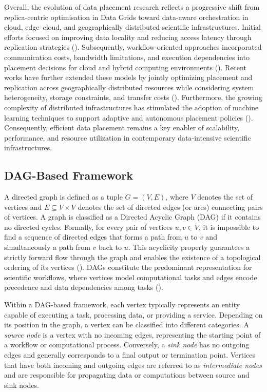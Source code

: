 \documentclass[a4paper,fleqn]{cas-dc}
\begin{document}
Overall, the evolution of data placement research reflects a progressive shift from replica-centric optimisation in Data Grids toward data-aware orchestration in cloud, edge--cloud, and geographically distributed scientific infrastructures. Initial efforts focused on improving data locality and reducing access latency through replication strategies (\citealp{rasool2007comparative}). Subsequently, workflow-oriented approaches incorporated communication costs, bandwidth limitations, and execution dependencies into placement decisions for cloud and hybrid computing environments (\citealp{lin2019time}). Recent works have further extended these models by jointly optimizing placement and replication across geographically distributed resources while considering system heterogeneity, storage constraints, and transfer costs (\citealp{Bouhouch2023Dynamic}). Furthermore, the growing complexity of distributed infrastructures has stimulated the adoption of machine learning techniques to support adaptive and autonomous placement policies (\citealp{10763884}). Consequently, efficient data placement remains a key enabler of scalability, performance, and resource utilization in contemporary data-intensive scientific infrastructures.


\subsection*{DAG-Based Framework}
\label{problem description}
\label{Background}

A directed graph is defined as a tuple \(G=(V,E)\), where \(V\) denotes the set of vertices and \(E \subseteq V \times V\) denotes the set of directed edges (or arcs) connecting pairs of vertices. A graph is classified as a Directed Acyclic Graph (DAG) if it contains no directed cycles. Formally, for every pair of vertices \(u,v \in V\), it is impossible to find a sequence of directed edges that forms a path from \(u\) to \(v\) and simultaneously a path from \(v\) back to \(u\). This acyclicity property guarantees a strictly forward flow through the graph and enables the existence of a topological ordering of its vertices (\citealp{bang2000theory,gould2012graph}). DAGs constitute the predominant representation for scientific workflows, where vertices model computational tasks and edges encode precedence and data dependencies among tasks (\citealp{deelman2015pegasus,tanaka2022automating}).

Within a DAG-based framework, each vertex typically represents an entity capable of executing a task, processing data, or providing a service. Depending on its position in the graph, a vertex can be classified into different categories. A \emph{source node} is a vertex with no incoming edges, representing the starting point of a workflow or computational process. Conversely, a \emph{sink node} has no outgoing edges and generally corresponds to a final output or termination point. Vertices that have both incoming and outgoing edges are referred to as \emph{intermediate nodes} and are responsible for propagating data or computations between source and sink nodes.
\end{document}
